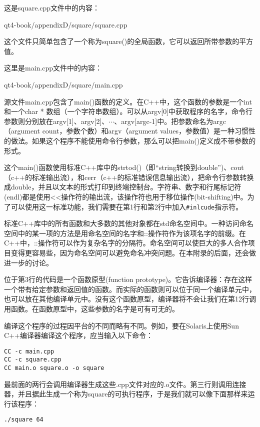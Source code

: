 \documentclass[11pt,oneside]{book}
\begin{document}
\begin{common-format}
这是square.cpp文件中的内容：
\begin{cppinput}{qt4-book/appendixD/square/square.cpp}
\end{cppinput}

这个文件只简单包含了一个称为square()的全局函数，它可以返回所带参数的平方值。

这里是main.cpp文件中的内容：
\begin{cppinput}{qt4-book/appendixD/square/main.cpp}
\end{cppinput}

源文件main.cpp包含了main()函数的定义。在C++中，这个函数的参数是一个int和一个char * 数组（一个字符串数组）。可以从argv[0]中获取程序的名字，命令行参数则分别放在argv[1]、argv[2]、$\cdots$、argv[argc-1]中。把参数命名为argc（argument count，参数个数）和argv（argument values，参数值）是一种习惯性的做法。如果这个程序不能使用命令行参数，那么可以把main()定义成不带参数的形式。
 
这个main()函数使用标准C++库中的strtod()（即“string转换到double”)、cout（c++的标准输出流），和cerr（c++的标准错误信息输出流），把命令行参数转换成double，并且以文本的形式打印到终端控制台。字符串、数字和行尾标记符(endl)都是使用<<操作符的输出流，该操作符也用于移位操作(bit-shifting)中。为了可以使用这一标准功能，我们需要在第1行和第2行中加入\verb+#inlcude+指示符。

标准C++库中的所有函数和大多数的其他对象都在std命名空间中。一种访问命名空间中的某一项的方法是用命名空间的名字和::操作符作为该项名字的前缀。在C++中，::操作符可以作为复杂名字的分隔符。命名空间可以使巨大的多人合作项目变得更容易些，因为命名空间可以避免命名冲突问题。在本附录的后面，还会做进一步的讨论。

位于第3行的代码是一个函数原型(function prototype)。它告诉编译器：存在这样一个带有给定参数和返回值的函数。而实际的函数则可以位于同一个编译单元中，也可以放在其他编译单元中。没有这个函数原型，编译器将不会让我们在第12行调用函数。在函数原型中，这些参数的名字是可有可无的。

编译这个程序的过程因平台的不同而略有不同。例如，要在Solaris上使用Sun C++编译器编译这个程序，应当输入以下命令：
\begin{Verbatim}
CC -c main.cpp
CC -c square.cpp
CC main.o square.o -o square
\end{Verbatim}

最前面的两行会调用编译器生成这些.cpp文件对应的.o文件。第三行则调用连接器，并且据此生成一个称为square的可执行程序，于是我们就可以像下面那样来运行该程序：
\begin{Verbatim}
./square 64
\end{Verbatim}


\end{common-format}
\end{document}
